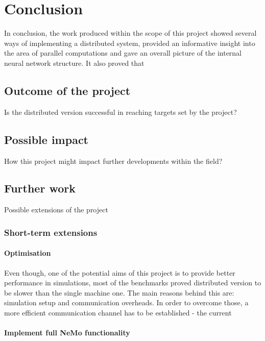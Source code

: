 \chapter{Conclusion}

In conclusion, the work produced within the scope of this project showed several ways of implementing a distributed system, provided an informative insight into the area of parallel computations and gave an overall picture of the internal neural network structure. It also proved that 

\section{Outcome of the project}

Is the distributed version successful in reaching targets set by the project?

\section{Possible impact}

How this project might impact further developments within the field?

\section{Further work}

Possible extensions of the project

\subsection{Short-term extensions}



\subsubsection{Optimisation}

Even though, one of the potential aims of this project is to provide better performance in simulations, most of the benchmarks proved distributed version to be slower than the single machine one. The main reasons behind this are: simulation setup and communication overheads. In order to overcome those, a more efficient communication channel has to be established - the current  

\subsubsection{Implement full NeMo functionality}

